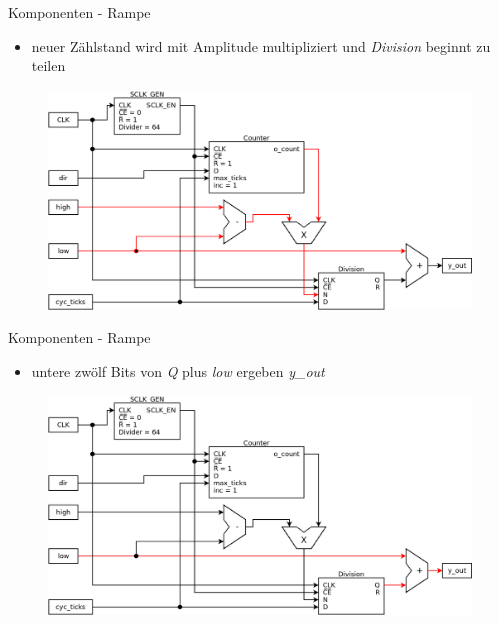 \documentclass[11pt]{beamer}
\begin{document}
\begin{frame}{Komponenten - Rampe}
  \begin{itemize}
    \item neuer Zählstand wird mit Amplitude multipliziert und \emph{Division} beginnt zu teilen
  \end{itemize}
  \begin{figure}
    \includegraphics[scale=0.28]{ramp_step2}
  \end{figure}
\end{frame}

\begin{frame}{Komponenten - Rampe}
  \begin{itemize}
    \item untere zwölf Bits von \emph{Q} plus \emph{low} ergeben \emph{y\_out}
  \end{itemize}
  \begin{figure}
    \includegraphics[scale=0.28]{ramp_step3}
  \end{figure}
\end{frame}
\end{document}
